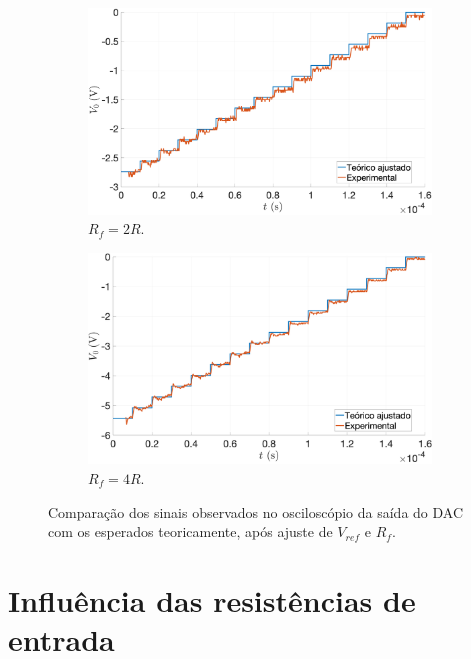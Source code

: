 \documentclass[a4paper, oneside]{article}
\begin{document}
\begin{figure}[ht]
	\centering
	\begin{subfigure}[b]{0.5\textwidth}
		\centering
		\includegraphics[width=\textwidth]{figures/cteAj_4_3_2_DAC_2R.png}
		\caption{$R_f=2R$.\\}
		\label{fig:cteAj_4_3_2_DAC_2R}
	\end{subfigure}%
	\hfill
	\begin{subfigure}[b]{0.5\textwidth}
		\centering
		\includegraphics[width=\textwidth]{figures/cteAj_4_3_2_DAC_4R.png}
		\caption{$R_f=4R$.\\}
		\label{fig:cteAj_4_3_2_DAC_4R}
	\end{subfigure}%
	\caption{Comparação dos sinais observados no osciloscópio da saída do DAC com os esperados teoricamente, após ajuste de $V_{ref}$ e $R_f$.\\}
	\label{fig:cteAj_4_3_2_DAC}
\end{figure}


\section{Influência das resistências de entrada}
\end{document}
